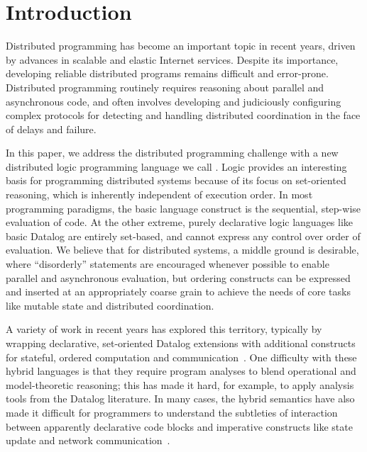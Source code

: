 \section{Introduction}
Distributed programming has become an important topic in recent years, driven by advances in scalable and elastic Internet services.  Despite its importance, developing reliable distributed programs remains difficult and error-prone.  Distributed programming routinely requires reasoning about parallel and asynchronous code, and often involves developing and judiciously configuring complex protocols for detecting and handling distributed coordination in the face of delays and failure.

In this paper, we address the distributed programming challenge with a new distributed logic programming language we call {\em \lang}.
Logic provides an interesting basis for programming distributed systems because of its focus on set-oriented reasoning, which is inherently independent of execution order.  In most programming paradigms, the basic language construct is the sequential, step-wise evaluation of code. At the other extreme, purely declarative logic languages like basic Datalog are entirely set-based, and cannot express any control over order of evaluation.  We believe that for distributed systems, a middle ground is desirable, where ``disorderly'' statements are encouraged whenever possible to enable parallel and asynchronous evaluation, but ordering constructs can be expressed and inserted at an appropriately coarse grain to achieve the needs of core tasks like mutable state and distributed coordination.

A variety of work in recent years has explored this territory, typically by wrapping declarative, set-oriented Datalog extensions with additional constructs for stateful, ordered computation and communication~\cite{boon,reactors,meld,prologevents}.  One difficulty with these hybrid languages is that they require program analyses to blend operational and model-theoretic reasoning; this has made it hard, for example, to apply analysis tools from the Datalog literature.  In many cases, the hybrid semantics have also made it difficult for programmers to understand the subtleties of interaction between apparently declarative code blocks and imperative constructs like state update and network communication~\cite{Mao2009,navarro}.

